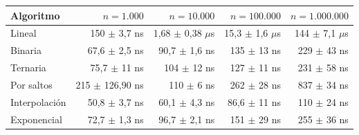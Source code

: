 {\scriptsize
\begin{tabular}{lrrrr}
\toprule
Algoritmo & $n=1.000$ & $n=10.000$ & $n=100.000$ & $n=1.000.000$ \\
\midrule
Lineal & 150 $\pm$ 3,7 ns & 1,68 $\pm$ 0,38 $\mu$s & 15,3 $\pm$ 1,6 $\mu$s & 144 $\pm$ 7,1 $\mu$s \\
Binaria & 67,6 $\pm$ 2,5 ns & 90,7 $\pm$ 1,6 ns & 135 $\pm$ 13 ns & 229 $\pm$ 43 ns \\
Ternaria & 75,7 $\pm$ 11 ns & 104 $\pm$ 12 ns & 127 $\pm$ 11 ns & 231 $\pm$ 58 ns \\
Por saltos & 215 $\pm$ 126,90 ns & 110 $\pm$ 6 ns & 262 $\pm$ 28 ns & 837 $\pm$ 34 ns \\
Interpolaci\'on & 50,8 $\pm$ 3,7 ns & 60,1 $\pm$ 4,3 ns & 86,6 $\pm$ 11 ns & 110 $\pm$ 24 ns \\
Exponencial & 72,7 $\pm$ 1,3 ns & 96,7 $\pm$ 2,1 ns & 151 $\pm$ 29 ns & 255 $\pm$ 36 ns \\
\bottomrule
\end{tabular}}\par
